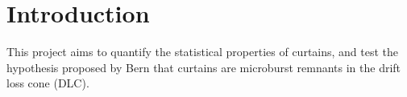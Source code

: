 \documentclass[
10pt, %
a4paper, %
oneside, %
headinclude,footinclude, %
BCOR5mm, %
]{scrartcl}
\title{\normalfont\spacedallcaps{AC6 Curtain Distribution Running Report}} %
\author{\spacedlowsmallcaps{Mykhaylo Shumko}}
\begin{document}

\renewcommand{\sectionmark}[1]{\markright{\spacedlowsmallcaps{#1}}} %
\lehead{\mbox{\llap{\small\thepage\kern1em\color{halfgray} \vline}\color{halfgray}\hspace{0.5em}\rightmark\hfil}} %

\pagestyle{scrheadings} %


\maketitle %

\setcounter{tocdepth}{2} %

\tableofcontents %

\listoffigures %

\listoftables %


\section{Introduction}
This project aims to quantify the statistical properties of curtains, and test the hypothesis proposed by Bern that curtains are microburst remnants in the drift loss cone (DLC).
\end{document}

